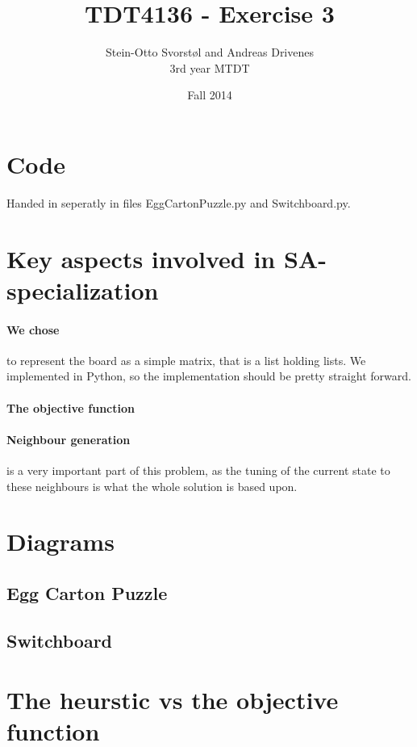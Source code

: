 \documentclass[11pt,a4paper]{article}
\author{Stein-Otto Svorstøl and Andreas Drivenes
\\3rd year MTDT}
\title{TDT4136 - Exercise 3}
\date{Fall 2014}
\begin{document}
\maketitle
\section{Code}
Handed in seperatly in files EggCartonPuzzle.py and Switchboard.py.

\section{Key aspects involved in SA-specialization}
\paragraph{We chose} to represent the board as a simple matrix, that is a list holding lists. We implemented in Python, so the implementation should be pretty straight forward.

\paragraph{The objective function}

\paragraph{Neighbour generation} is a very important part of this problem, as the tuning of the current state to these neighbours is what the whole solution is based upon.
\section{Diagrams}
\subsection{Egg Carton Puzzle}

\subsection{Switchboard}

\section{The heurstic vs the objective function}
\end{document}
